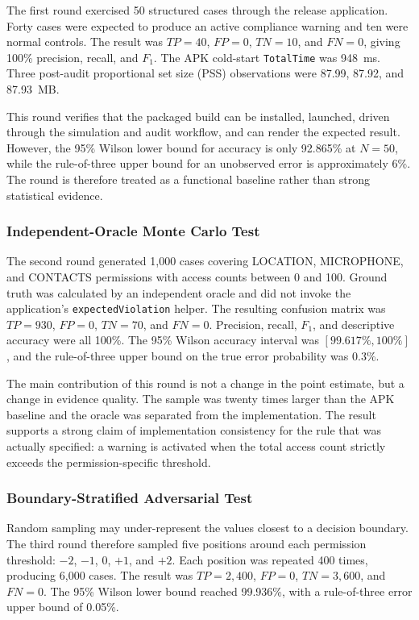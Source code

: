 The first round exercised 50 structured cases through the release application. Forty cases were expected to produce an active compliance warning and ten were normal controls. The result was \(TP=40\), \(FP=0\), \(TN=10\), and \(FN=0\), giving 100\% precision, recall, and \(F_1\). The APK cold-start \texttt{TotalTime} was 948~ms. Three post-audit proportional set size (PSS) observations were 87.99, 87.92, and 87.93~MB.

This round verifies that the packaged build can be installed, launched, driven through the simulation and audit workflow, and can render the expected result. However, the 95\% Wilson lower bound for accuracy is only 92.865\% at \(N=50\), while the rule-of-three upper bound for an unobserved error is approximately 6\%. The round is therefore treated as a functional baseline rather than strong statistical evidence.

\subsubsection{Independent-Oracle Monte Carlo Test}

The second round generated 1,000 cases covering LOCATION, MICROPHONE, and CONTACTS permissions with access counts between 0 and 100. Ground truth was calculated by an independent oracle and did not invoke the application's \texttt{expectedViolation} helper. The resulting confusion matrix was \(TP=930\), \(FP=0\), \(TN=70\), and \(FN=0\). Precision, recall, \(F_1\), and descriptive accuracy were all 100\%. The 95\% Wilson accuracy interval was \([99.617\%,100\%]\), and the rule-of-three upper bound on the true error probability was 0.3\%.

The main contribution of this round is not a change in the point estimate, but a change in evidence quality. The sample was twenty times larger than the APK baseline and the oracle was separated from the implementation. The result supports a strong claim of implementation consistency for the rule that was actually specified: a warning is activated when the total access count strictly exceeds the permission-specific threshold.

\subsubsection{Boundary-Stratified Adversarial Test}

Random sampling may under-represent the values closest to a decision boundary. The third round therefore sampled five positions around each permission threshold: \(-2\), \(-1\), \(0\), \(+1\), and \(+2\). Each position was repeated 400 times, producing 6,000 cases. The result was \(TP=2,400\), \(FP=0\), \(TN=3,600\), and \(FN=0\). The 95\% Wilson lower bound reached 99.936\%, with a rule-of-three error upper bound of 0.05\%.

